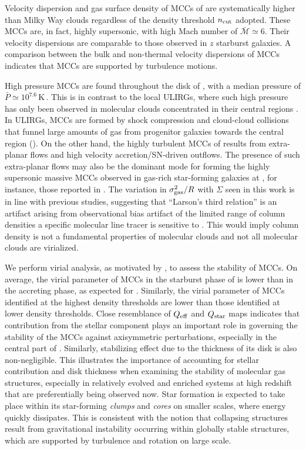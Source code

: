 \IfFileExists{emulateapjlegacy.cls}{\documentclass[iop]{emulateapjlegacy}}{\documentclass[iop]{emulateapj}}
\begin{document}
Velocity dispersion and gas surface density of MCCs of \flower are systematically higher than Milky Way clouds regardless of the density threshold $n_{\rm cut}$ adopted. These MCCs are, in fact, highly supersonic, with high Mach number of $\bar{\mathcal{M}}\simeq6$. Their velocity dispersions are comparable to those observed in $z$ starburst galaxies. A comparison between the bulk and non-thermal velocity dispersions of MCCs indicates that MCCs
are supported by turbulence motions.

High pressure MCCs are found throughout the disk of \flower, with a median pressure of $\bar{P}\simeq10^{7.6}$\,K\,\cc. This is in contrast to the local ULIRGs, where such high pressure has only been observed in molecular clouds concentrated in their central regions \citep{Downes98a, Sakamoto08a}. In ULIRGs, MCCs are formed by shock compression and cloud-cloud collisions that funnel large amounts of gas from progenitor galaxies towards the central region (\citealt{Tan00a, Wu18a}). On the other hand, the highly turbulent MCCs of \flower results from extra-planar flows and high velocity accretion/SN-driven outflows. The presence of such extra-planar flows may also be the dominant mode for forming the highly supersonic massive MCCs observed in gas-rich star-forming galaxies at \z{}, for instance, those reported in \citet{Swinbank11a}.
%
The variation in $\sigma_{\rm gas}^2/R$ with $\Sigma$ seen in this work is in line with previous studies, suggesting that ``Larson's third relation'' is an artifact arising from observational bias artifact of the limited range of  column densities a specific molecular line tracer is sensitive to \citep[][]{Ballesteros02a, Ballesteros11a}. This would imply column density is not a fundamental properties of molecular clouds and not all molecular clouds are virialized.

We perform virial analysis, as motivated by \obs, to assess the stability of MCCs. On average, the virial parameter of MCCs in the starburst phase of \flower is lower than in the accreting phase, as expected for \SF. Similarly, the virial parameter of MCCs identified at the highest density thresholds are lower than those identified at lower density thresholds.
Close resemblance of $Q_{\rm eff}$ and $Q_{\rm star}$ maps indicates that contribution from the stellar component plays an important role in governing the stability of the MCCs against axisymmetric perturbations, especially in the central part of \flower. Similarly, stabilizing effect due to the thickness of its disk is also non-negligible. This illustrates the importance of accounting for stellar contribution and disk thickness when examining the stability of molecular gas structures, especially in relatively evolved and enriched systems at high redshift that are preferentially being observed now.
%
Star formation is expected to take place within its star-forming {\it clumps} and {\it cores} on smaller scales, where energy quickly dissipates. This is consistent with the notion that collapsing structures result from gravitational instability occurring within globally stable structures, which are supported by turbulence and rotation on large scale.
\end{document}
